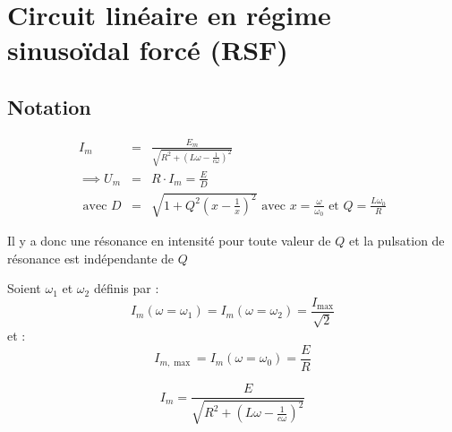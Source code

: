 \chapter{Circuit linéaire en régime sinusoïdal forcé (RSF)}
\section{Notation}

\begin{notation}
    \begin{eqnarray*}
    I_{m} &=& \frac{E_{m}}{\sqrt{R^{2} + (L \omega -\frac{1}{c \omega })^{2}}} \\
    \implies U_{m} &=& R \cdot I_{m} = \frac{E}{D}  \\ 
    \text{ avec } D &=& \sqrt{1+Q^{2}(x-\frac{1}{x})^{2}} \text{ avec } x = \frac{\omega }{\omega _{0}} \text{ et } Q = \frac{L \omega_{0}}{R}
\end{eqnarray*}
\end{notation}

Il y a donc une résonance en intensité pour toute valeur de \(Q\) et la pulsation de résonance est indépendante de \(Q\) 
\begin{definition}
    Soient \(\omega_{1}\) et \(\omega _{2}\) définis par : 
    \[
        I_{m}(\omega = \omega _{1}) = I_{m}(\omega = \omega_{2}) = \frac{I_{\max }}{\sqrt{2}}
    \]  
    et : 
    \[
        I_{m, \max } = I_{m} (\omega = \omega _{0}) = \frac{E}{R}
    \]
\end{definition}

\begin{remark}[rem]
    \[
        I_{m} = \frac{E}{\sqrt{R^{2} + (L \omega - \frac{1}{c \omega })^{2}}}
    \]
\end{remark}

